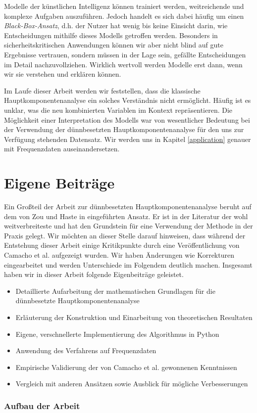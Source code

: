 Modelle der künstlichen Intelligenz können trainiert werden, weitreichende und komplexe Aufgaben auszuführen. Jedoch handelt es sich dabei häufig um einen \textit{Black-Box-Ansatz}, d.h. der Nutzer hat wenig bis keine Einsicht darin, wie Entscheidungen mithilfe dieses Modells getroffen werden. Besonders in sicherheitskritischen Anwendungen können wir aber nicht blind auf gute Ergebnisse vertrauen, sondern müssen in der Lage sein, gefällte Entscheidungen im Detail nachzuvollziehen. Wirklich wertvoll werden Modelle erst dann, wenn wir sie verstehen und erklären können.

Im Laufe dieser Arbeit werden wir feststellen, dass die klassische Hauptkomponentenanalyse ein solches Verständnis nicht ermöglicht. Häufig ist es unklar, was die neu kombinierten Variablen im Kontext repräsentieren. Die Möglichkeit einer Interpretation des Modells war von wesentlicher Bedeutung bei der Verwendung der dünnbesetzten Hauptkomponentenanalyse für den uns zur Verfügung stehenden Datensatz. Wir werden uns in Kapitel \ref{application} genauer mit Frequenzdaten auseinandersetzen.




\section{Eigene Beiträge}

Ein Großteil der Arbeit zur dünnbesetzten Hauptkomponentenanalyse beruht auf dem von Zou und Haste in \cite{zou_sparsepca} eingeführten Ansatz. Er ist in der Literatur der wohl weitverbreiteste und hat den Grundstein für eine Verwendung der Methode in der Praxis gelegt. Wir möchten an dieser Stelle darauf hinweisen, dass während der Entstehung dieser Arbeit einige Kritikpunkte durch eine Veröffentlichung von Camacho et al. aufgezeigt wurden. Wir haben Änderungen wie Korrekturen eingearbeitet und werden Unterschiede im Folgendem deutlich machen. Insgesamt haben wir in dieser Arbeit folgende Eigenbeiträge geleistet.
\begin{itemize}
\item Detaillierte Aufarbeitung der mathematischen Grundlagen für die dünnbesetzte Hauptkomponentenanalyse
\item Erläuterung der Konstruktion und Einarbeitung von theoretischen Resultaten
\item Eigene, verschnellerte Implementierung des Algorithmus in Python
\item Anwendung des Verfahrens auf Frequenzdaten
\item Empirische Validierung der von Camacho et al. gewonnenen Kenntnissen
\item Vergleich mit anderen Ansätzen sowie Ausblick für mögliche Verbesserungen
\end{itemize}

\subsubsection{Aufbau der Arbeit}